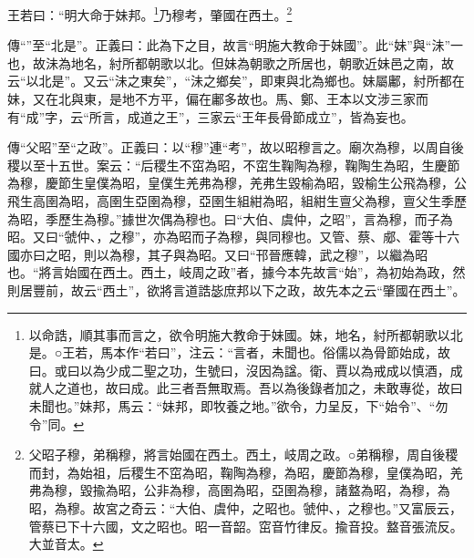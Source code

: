 王若曰：“明大命于妹邦。\footnote{以命誥，順其事而言之，欲令明施大教命于妹國。妹，地名，紂所都朝歌以北是。○王若，馬本作“若曰”，注云：“言者，未聞也。俗儒以為骨節始成，故曰。或曰以為少成二聖之功，生號曰，沒因為諡。衛、賈以為戒成以慎酒，成就人之道也，故曰成。此三者吾無取焉。吾以為後錄者加之，未敢專從，故曰未聞也。”妹邦，馬云：“妹邦，即牧養之地。”欲令，力呈反，下“始令”、“勿令”同。}乃穆考，肇國在西土。\footnote{父昭子穆，弟稱穆，將言始國在西土。西土，岐周之政。○弟稱穆，周自後稷而封，為始祖，后稷生不窋為昭，鞠陶為穆，為昭，慶節為穆，皇僕為昭，羌弗為穆，毀揄為昭，公非為穆，高圉為昭，亞圉為穆，諸盩為昭，為穆，為昭，為穆。故宮之奇云：“大伯、虞仲，之昭也。虢仲、，之穆也。”又富辰云，管蔡已下十六國，文之昭也。昭一音韶。窋音竹律反。揄音投。盩音張流反。大並音太。}


{\noindent\zhuan{}\fzbyks 傳“”至“北是”。正義曰：此為下之目，故言“明施大教命于妹國”。此“妹”與“沬”一也，故沬為地名，紂所都朝歌以北。但妹為朝歌之所居也，朝歌近妹邑之南，故云“以北是”。又云“沬之東矣”，“沬之鄉矣”，即東與北為鄉也。妹屬鄘，紂所都在妹，又在北與東，是地不方平，偏在鄘多故也。馬、鄭、王本以文涉三家而有“成”字，云“所言，成道之王”，三家云“王年長骨節成立”，皆為妄也。 \par}

{\noindent\zhuan{}\fzbyks 傳“父昭”至“之政”。正義曰：以“穆”連“考”，故以昭穆言之。廟次為穆，以周自後稷以至十五世。案云：“后稷生不窋為昭，不窋生鞠陶為穆，鞠陶生為昭，生慶節為穆，慶節生皇僕為昭，皇僕生羌弗為穆，羌弗生毀榆為昭，毀榆生公飛為穆，公飛生高圉為昭，高圉生亞圉為穆，亞圉生組紺為昭，組紺生亶父為穆，亶父生季歷為昭，季歷生為穆。”據世次偶為穆也。曰“大伯、虞仲，之昭”，言為穆，而子為昭。又曰“虢仲、，之穆”，亦為昭而子為穆，與同穆也。又管、蔡、郕、霍等十六國亦曰之昭，則以為穆，其子與為昭。又曰“邗晉應韓，武之穆”，以繼為昭也。“將言始國在西土。西土，岐周之政”者，據今本先故言“始”，為初始為政，然則居豐前，故云“西土”，欲將言道誥毖庶邦以下之政，故先本之云“肇國在西土”。 \par}

